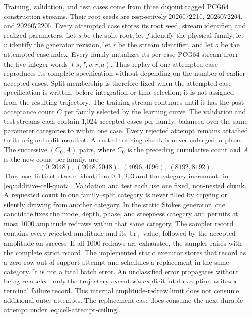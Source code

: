\documentclass[11pt]{article}
\begin{document}
Training, validation, and test cases come from three disjoint tagged
PCG64 construction streams.  Their root seeds are respectively
2026072210, 2026072204, and 2026072205.
Every attempted case stores its root seed, stream identifier, and realized
parameters.  Let $s$ be the split root, let $f$ identify the physical family,
let $v$ identify the generator revision, let $r$ be the stream identifier,
and let $a$ be the attempted-case index.  Every family initializes its
per-case PCG64 stream from the five integer words $(s,f,v,r,a)$.  Thus replay
of one attempted case reproduces its complete specification without depending
on the number of earlier accepted cases.  Split membership is therefore fixed
when the attempted case specification is written, before integration or time
selection; it is not assigned from the resulting trajectory.  The training
stream continues until it has the post-acceptance count $C$ per family selected
by the learning curve.  The validation and test streams each contain 1,024
accepted cases per family, balanced over the same parameter categories to
within one case.  Every
rejected attempt remains attached to its original split manifest.
A nested training chunk is never enlarged in place.  The successive
$(C_0,A)$ pairs, where $C_0$ is the preceding cumulative count and $A$ is the
new count per family, are
\[
  (0,2048),\ (2048,2048),\ (4096,4096),\
  (8192,8192).
\]
They use distinct stream identifiers $0,1,2,3$ and the category increments in
\eqref{eq:additive-cell-quota}.  Validation and test each use one fixed,
non-nested chunk.
A requested count in one family--split category is never filled by copying or
silently drawing from another category.  In the static Stokes generator, one
candidate fixes the mode, depth, phase, and steepness category and permits at most
1000 amplitude redraws within that same category.  The sampler record contains
every rejected amplitude and its $\mathrm{Ur}_+$ value, followed by the
accepted amplitude on success.  If all 1000 redraws are exhausted, the sampler
raises with the complete strict record.  The implemented static executor
stores that record as a zero-row out-of-support attempt and schedules a
replacement in the same category.  It is not a fatal batch error.  An
unclassified error propagates without being relabeled; only the trajectory
executor's explicit fatal exception writes a terminal failure record.
This internal amplitude-redraw limit does not consume additional outer
attempts.  The replacement case does consume the next durable attempt under
\eqref{eq:cell-attempt-ceiling}.
\end{document}
